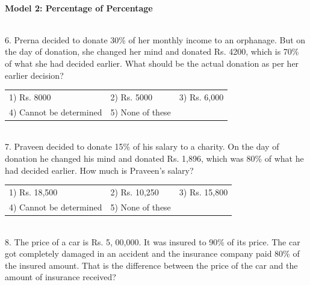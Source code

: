 \documentclass{article}
\begin{document}
\noindent 

\noindent 

\noindent 

\noindent 

\noindent \textbf{\\ Model 2: Percentage of Percentage \\}

\noindent 

\noindent \\ 6.   Prerna decided to donate 30\% of her monthly income to an orphanage. But on the day of donation, she changed her mind and donated Rs. 4200, which is 70\% of what she had decided earlier. What should be the actual donation as per her earlier decision?

\noindent 

\begin{tabular}{p{2.0in}p{1.4in}p{1.7in}} 
1) Rs. 8000 & 2) Rs. 5000 & 3) Rs. 6,000 \\ 
4) Cannot be determined & 5) None of these &  \\  
\end{tabular}



\noindent 

\noindent 
\newpage
\noindent \\ 7.   Praveen decided to donate 15\% of his salary to a charity. On the day of donation he changed his mind and donated Rs. 1,896, which was 80\% of what he had decided earlier. How much is Praveen's salary?

\noindent 

\begin{tabular}{p{2.0in} p{1.4in} p{0.8in}} 
1) Rs. 18,500 & 2) Rs. 10,250 & 3) Rs. 15,800 \\ 
4) Cannot be determined & 5) None of these &  \\
\end{tabular}



\noindent 

\noindent 

\noindent 

\noindent \\ 8.   The price of a car is Rs. 5, 00,000. It was insured to 90\% of its price. The car got completely damaged in an accident and the insurance company paid 80\% of the   insured amount. That is the difference between the price of the car and the amount of insurance received?

\noindent 
\end{document}
